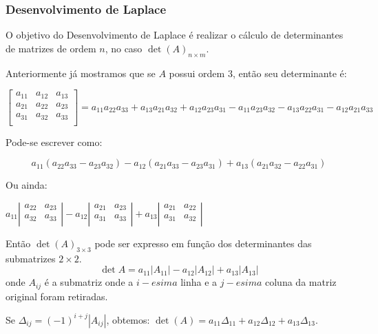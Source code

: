 \documentclass[oneside,a4paper,12pt]{article}
\begin{document}
\subsubsection{Desenvolvimento de Laplace}

O objetivo do Desenvolvimento de Laplace é realizar o cálculo de determinantes de matrizes de ordem $n$, no caso $\det (A)_{n \times m}$.

Anteriormente já mostramos que se $A$ possui ordem $3$, então seu determinante é:

$$
\left[
\begin{array}{ccc}
a_{11}	&	a_{12}		&	a_{13}	\\
a_{21}	&	a_{22}		&	a_{23}	\\
a_{31}	&	a_{32}		&	a_{33}	\\
\end{array}
\right]
=
a_{11}a_{22}a_{33}+a_{13}a_{21}a_{32}+a_{12}a_{23}a_{31}-a_{11}a_{23}a_{32}-a_{13}a_{22}a_{31}-a_{12}a_{21}a_{33}
$$

Pode-se escrever como:

$$
a_{11}(a_{22}a_{33}-a_{23}a_{32})-a_{12}(a_{21}a_{33}-a_{23}a_{31})+a_{13}(a_{21}a_{32}-a_{22}a_{31})
$$

Ou ainda:
\begin{center}
$a_{11}
\left|
\begin{array}{cc}
a_{22}	&	a_{23}	\\
a_{32}	&	a_{33}	\\
\end{array}
\right|
-
a_{12}
\left|
\begin{array}{cc}
a_{21}	&	a_{23}	\\
a_{31}	&	a_{33}	\\
\end{array}
\right|
+
a_{13}
\left|
\begin{array}{cc}
a_{21}	&	a_{22}	\\
a_{31}	&	a_{32}	\\
\end{array}
\right|
$
\end{center}

Então $\det(A)_{3\times3}$ pode ser expresso em função dos determinantes das submatrizes $2\times2$.
$$\det A = a_{11}|A_{11}|-a_{12}|A_{12}|+a_{13}|A_{13}|$$
onde $A_{ij}$ é a submatriz onde a $i-esima$ linha e a $j-esima$ coluna da matriz original foram retiradas.

Se $\Delta_{ij} = (-1)^{i+j}|A_{ij}|$, obtemos: $\det(A)=a_{11}\Delta_{11}+a_{12}\Delta_{12}+a_{13}\Delta_{13}$.
\end{document}
